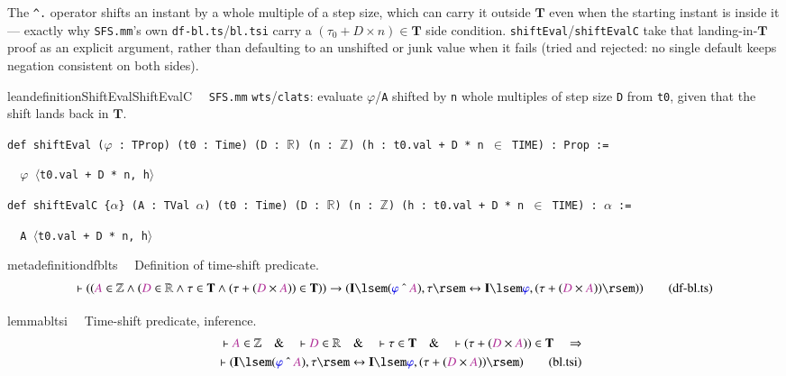 
\pn The \texttt{\^{}.} operator shifts an instant by a whole multiple of a step size, which can carry it outside $\mathbf{T}$ even when the starting instant is inside it --- exactly why \texttt{SFS.mm}'s own \texttt{df-bl.ts}/\texttt{bl.tsi} carry a $(\tau_0+D\times n)\in\mathbf{T}$ side condition. \texttt{shiftEval}/\texttt{shiftEvalC} take that landing-in-$\mathbf{T}$ proof as an explicit argument, rather than defaulting to an unshifted or junk value when it fails (tried and rejected: no single default keeps negation consistent on both sides).

\begin{restatable}{leandefinition}{ShiftEvalShiftEvalC}~~ \texttt{SFS.mm} \texttt{wts}/\texttt{clats}: evaluate $\varphi$/\texttt{A} shifted by \texttt{n} whole multiples of step size \texttt{D} from \texttt{t0}, given that the shift lands back in $\mathbf{T}$.

\texttt{\textcolor{leancolor}{def} \textcolor{leanyellow}{shiftEval} ($\varphi$ : TProp) (t0 : Time) (D : $\mathbb{R}$) (n : $\mathbb{Z}$) (h : t0.val + D * n $\in$ TIME) : Prop :=}

\texttt{~~$\varphi$ $\langle$t0.val + D * n, h$\rangle$}

\texttt{\textcolor{leancolor}{def} \textcolor{leanyellow}{shiftEvalC} \{$\alpha$\} (A : TVal $\alpha$) (t0 : Time) (D : $\mathbb{R}$) (n : $\mathbb{Z}$) (h : t0.val + D * n $\in$ TIME) : $\alpha$ :=}

\texttt{~~A $\langle$t0.val + D * n, h$\rangle$}
\label{shiftEval}
\label{shiftEvalC}
\end{restatable}

\begin{restatable}{metadefinition}{dfblts}~~ Definition of time-shift predicate.
\begin{align}
\vdash ( ( \mc{A} \in \mathbb{Z} \wedge ( \mc{D} \in \mathbb{R} \wedge \tau \in
    \mathbf{T} \wedge ( \tau + ( \mc{D} \times \mc{A} ) ) \in \mathbf{T} ) )
    \rightarrow ( \mathbf{I} \lsem ( \mw{\varphi} ~\string^~ \mc{A} ) , \tau
    \rsem \leftrightarrow \mathbf{I} \lsem \mw{\varphi} , ( \tau + ( \mc{D}
    \times \mc{A} ) ) \rsem ) )\label{eq:df-bl.ts}\tag{df-bl.ts}
\end{align}
\end{restatable}

\begin{restatable}{lemma}{bltsi}~~ Time-shift predicate, inference.
\begin{align}
\vdash \mc{A} \in \mathbb{Z}\quad\&\quad \vdash \mc{D} \in
    \mathbb{R}\quad\&\quad \vdash \tau \in \mathbf{T}\quad\&\quad \vdash ( \tau
    + ( \mc{D} \times \mc{A} ) ) \in \mathbf{T}\quad\Rightarrow \notag \\ %
      \quad \vdash (
    \mathbf{I} \lsem ( \mw{\varphi} ~\string^~ \mc{A} ) , \tau \rsem
    \leftrightarrow \mathbf{I} \lsem \mw{\varphi} , ( \tau + ( \mc{D} \times
    \mc{A} ) ) \rsem )\label{eq:bl.tsi}\tag{bl.tsi}
\end{align}
\end{restatable}

